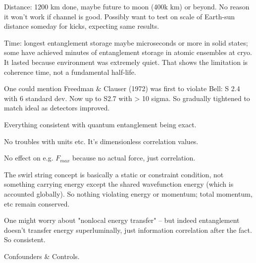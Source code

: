 \documentclass[11pt]{article}
\begin{document}
Distance: 1200 km done, maybe future to moon (400k km) or beyond. No reason it won't work if channel is good. Possibly want to test on scale of Earth-sun distance someday for kicks, expecting same results.

Time: longest entanglement storage maybe microseconds or more in solid states; some have achieved minutes of entanglement storage in atomic ensembles at cryo. It lasted because environment was extremely quiet. That shows the limitation is coherence time, not a fundamental half-life.

One could mention Freedman & Clauser (1972) was first to violate Bell: S 2.4 with 6 standard dev. Now up to S2.7 with > 10 sigma. So gradually tightened to match ideal as detectors improved.

Everything consistent with quantum entanglement being exact.

No troubles with units etc. It's dimensionless correlation values.

No effect on e.g. $F_{max}$ because no actual force, just correlation.

The swirl string concept is basically a static or constraint condition, not something carrying energy except the shared wavefunction energy (which is accounted globally). So nothing violating energy or momentum; total momentum, etc remain conserved.

One might worry about "nonlocal energy transfer" – but indeed entanglement doesn't transfer energy superluminally, just information correlation after the fact. So consistent.


Confounders & Controls.
\end{document}
